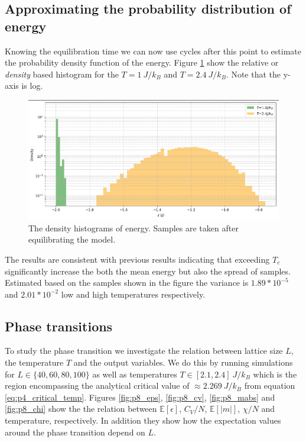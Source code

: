 \documentclass[../main_proj4_correct_template.tex]{subfiles}
\begin{document}
\subsection{Approximating the probability distribution of energy}

Knowing the equilibration time we can now use cycles after this point to estimate the probability density function of the energy. Figure \ref{fig:p4_p6pdf} show the relative or \textit{density} based histogram for the $T=1~J/k_B$ and $T=2.4~J/k_B$. Note that the y-axis is log.

\begin{figure}[h!]
    \centering
    \includegraphics[width=0.8\linewidth]{Project 4/figures/p6_pdfeps.png}
    \caption{The density histograms of energy. Samples are taken after equilibrating the model.}
    \label{fig:p4_p6pdf}
\end{figure}

The results are consistent with previous results indicating that exceeding $T_c$ significantly increase the both the mean energy but also the spread of samples. Estimated based on the samples shown in the figure the variance is $1.89*10^{-5}$ and $2.01*10^{-2}$ low and high temperatures respectively. 

\subsection{Phase transitions}

To study the phase transition we investigate the relation between lattice size $L$, the temperature $T$ and the output variables. We do this by running simulations for $L\in\{40,60,80,100\}$ as well as temperatures $T\in[2.1, 2.4]~J/k_B$ which is the region encompassing the analytical critical value of $\approx 2.269~J/k_B$ from equation \eqref{eq:p4_critical_temp}. Figures \ref{fig:p8_eps}, \ref{fig:p8_cv}, \ref{fig:p8_mabs} and \ref{fig:p8_chi} show the the relation between $\mathbb{E}[\epsilon]$, $C_V/N$, $\mathbb{E}[|m|]$, $\chi/N$ and temperature, respectively. In addition they show how the expectation values around the phase transition depend on $L$. 
\end{document}
